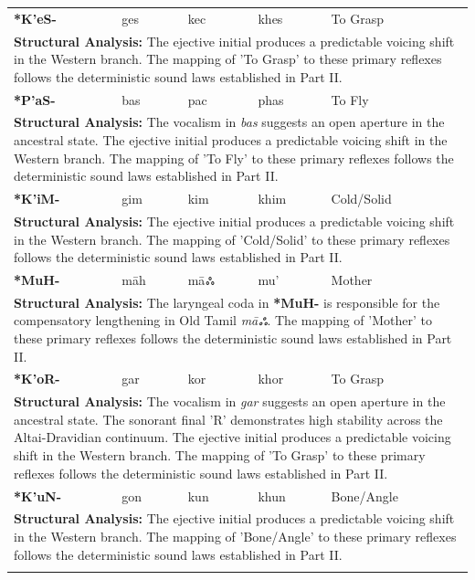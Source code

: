 \begin{longtable}{p{} p{} p{} p{} p{}}
\textbf{*K'eS-} & ges & kec & khes & To Grasp \\ 
\multicolumn{5}{p{\textwidth}}{\small \textbf{Structural Analysis:} The ejective initial produces a predictable voicing shift in the Western branch. The mapping of 'To Grasp' to these primary reflexes follows the deterministic sound laws established in Part II.} \\ \addlinespace[15pt] 
\textbf{*P'aS-} & bas & pac & phas & To Fly \\ 
\multicolumn{5}{p{\textwidth}}{\small \textbf{Structural Analysis:} The vocalism in \textit{bas} suggests an open aperture in the ancestral state. The ejective initial produces a predictable voicing shift in the Western branch. The mapping of 'To Fly' to these primary reflexes follows the deterministic sound laws established in Part II.} \\ \addlinespace[15pt] 
\textbf{*K'iM-} & gim & kim & khim & Cold/Solid \\ 
\multicolumn{5}{p{\textwidth}}{\small \textbf{Structural Analysis:} The ejective initial produces a predictable voicing shift in the Western branch. The mapping of 'Cold/Solid' to these primary reflexes follows the deterministic sound laws established in Part II.} \\ \addlinespace[15pt] 
\textbf{*MuH-} & māh & māஃ & mu' & Mother \\ 
\multicolumn{5}{p{\textwidth}}{\small \textbf{Structural Analysis:} The laryngeal coda in \textbf{*MuH-} is responsible for the compensatory lengthening in Old Tamil \textit{māஃ}. The mapping of 'Mother' to these primary reflexes follows the deterministic sound laws established in Part II.} \\ \addlinespace[15pt] 
\textbf{*K'oR-} & gar & kor & khor & To Grasp \\ 
\multicolumn{5}{p{\textwidth}}{\small \textbf{Structural Analysis:} The vocalism in \textit{gar} suggests an open aperture in the ancestral state. The sonorant final 'R' demonstrates high stability across the Altai-Dravidian continuum. The ejective initial produces a predictable voicing shift in the Western branch. The mapping of 'To Grasp' to these primary reflexes follows the deterministic sound laws established in Part II.} \\ \addlinespace[15pt] 
\textbf{*K'uN-} & gon & kun & khun & Bone/Angle \\ 
\multicolumn{5}{p{\textwidth}}{\small \textbf{Structural Analysis:} The ejective initial produces a predictable voicing shift in the Western branch. The mapping of 'Bone/Angle' to these primary reflexes follows the deterministic sound laws established in Part II.} \\ \addlinespace[15pt] 

\end{longtable}
